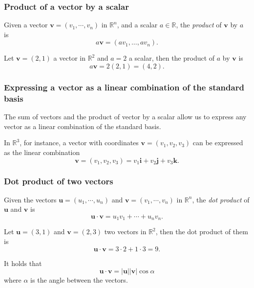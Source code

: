 \begin{frame}
\frametitle{Product of a vector by a scalar}
\begin{definition}
Given a vector $\mathbf{v}=(v_1,\cdots,v_n)$ in $\mathbb{R}^n$, and a scalar $a\in \mathbb{R}$, the \emph{product} of $\mathbf{v}$ by $a$ is 
\[
a\mathbf{v} = (av_1,\ldots, av_n).
\]
\end{definition}
Let $\mathbf{v}=(2,1)$ a vector in $\mathbb{R}^2$ and $a=2$ a scalar, then the product of $a$ by $\mathbf{v}$ is
\[
a\mathbf{v} = 2(2,1) = (4,2).
\]

\begin{center}

\end{center}
\end{frame}


\begin{frame}
\frametitle{Expressing a vector as a linear combination of the standard basis}
The sum of vectors and the product of vector by a scalar allow us to express any vector as a linear combination of the standard basis. 

In $\mathbb{R}^3$, for instance, a vector with coordinates $\mathbf{v}=(v_1,v_2,v_3)$ can be expressed as the linear combination
\[
\mathbf{v}=(v_1,v_2,v_3) = v_1\mathbf{i}+v_2\mathbf{j}+v_3\mathbf{k}.
\]

\begin{center}

\end{center}
\end{frame}


\begin{frame}
\frametitle{Dot product of two vectors}
\begin{definition}
Given the vectors $\mathbf{u}=(u_1,\cdots,u_n)$ and $\mathbf{v}=(v_1,\cdots,v_n)$ in $\mathbb{R}^n$, the 
\emph{dot product} of $\mathbf{u}$ and $\mathbf{v}$ is
\[
\mathbf{u}\cdot \mathbf{v} = u_1v_1 + \cdots + u_nv_n.
\]
\end{definition}

Let $\mathbf{u}=(3,1)$ and $\mathbf{v}=(2,3)$ two vectors in $\mathbb{R}^2$, then the dot product of them is
\[
\mathbf{u}\cdot\mathbf{v} = 3\cdot 2 +1\cdot 3 = 9.
\]

It holds that 
\[
\mathbf{u}\cdot\mathbf{v} =  |\mathbf{u}||\mathbf{v}|\cos\alpha
\]
where $\alpha$ is the angle between the vectors.
\end{frame}


